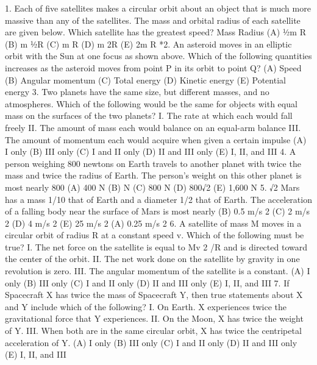 1.
Each of five satellites makes a circular orbit about an object that is much more massive than any of the
satellites. The mass and orbital radius of each satellite are given below. Which satellite has the greatest speed?
Mass Radius
(A) 1⁄2m
R
(B)
m
1⁄2R
(C)
m
R
(D)
m
2R
(E)
2m
R
*2. An asteroid moves in an elliptic orbit with the Sun at one focus as shown above. Which of the following
quantities increases as the asteroid moves from point P in its orbit to point Q?
(A) Speed (B) Angular momentum (C) Total energy (D) Kinetic energy (E) Potential energy
3. Two planets have the same size, but different masses, and no atmospheres. Which of the following would be the
same for objects with equal mass on the surfaces of the two planets?
I. The rate at which each would fall freely
II. The amount of mass each would balance on an equal-arm balance
III. The amount of momentum each would acquire when given a certain impulse
(A) I only (B) III only (C) I and II only (D) II and III only (E) I, II, and III
4. A person weighing 800 newtons on Earth travels to another planet with twice the mass and twice the radius of
Earth. The person's weight on this other planet is most nearly
800
(A) 400 N
(B) N (C) 800 N (D) 800√2
(E) 1,600 N
5.
√2
Mars has a mass 1/10 that of Earth and a diameter 1/2 that of Earth. The acceleration of a falling body near the
surface of Mars is most nearly
(B) 0.5 m/s 2
(C) 2 m/s 2
(D) 4 m/s 2
(E) 25 m/s 2
(A) 0.25 m/s 2
6. A satellite of mass M moves in a circular orbit of radius R at a constant speed v. Which of the following must
be true?
I. The net force on the satellite is equal to Mv 2 /R and is directed toward the center of the orbit.
II. The net work done on the satellite by gravity in one revolution is zero.
III. The angular momentum of the satellite is a constant.
(A) I only (B) III only (C) I and II only (D) II and III only (E) I, II, and III
7. If Spacecraft X has twice the mass of Spacecraft Y, then true statements about X and Y include which of the
following?
I. On Earth. X experiences twice the gravitational force that Y experiences.
II. On the Moon, X has twice the weight of Y.
III. When both are in the same circular orbit, X has twice the centripetal acceleration of Y.
(A) I only (B) III only (C) I and II only (D) II and III only (E) I, II, and III



